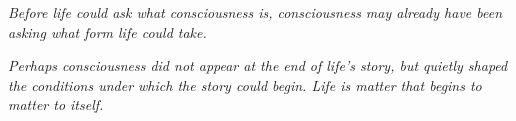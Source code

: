 \begin{flushright}
\emph{Before life could ask what consciousness is, consciousness may already have been asking what form life could take.}

\vspace{0.5em}

\emph{Perhaps consciousness did not appear at the end of life’s story, but quietly shaped the conditions under which the story could begin. Life is matter that begins to matter to itself.}
\end{flushright}

\clearpage